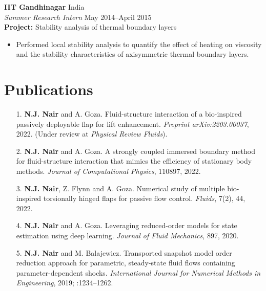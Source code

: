 \documentclass[margin]{res}
\begin{document}
\begin{resume}
{\bf IIT Gandhinagar} \hfill India\\
{\it Summer Research Intern} \hfill   May 2014--April 2015\\
\textbf{Project:} Stability analysis of thermal boundary layers
\begin{itemize}
	\item Performed local stability analysis to quantify the effect of heating on viscosity and the stability characteristics of axisymmetric thermal boundary layers.%
\end{itemize}


\section{\large Publications}
 \begin{itemize}
 
  	\item[1.] \textbf{N.J. Nair} and A. Goza. Fluid-structure interaction of a bio-inspired passively deployable flap for lift enhancement. \textit{Preprint arXiv:2203.00037}, 2022. (Under review at \textit{Physical Review Fluids}).

	\item[2.] \textbf{N.J. Nair} and A. Goza. A strongly coupled immersed boundary method for fluid-structure interaction that mimics the efficiency of stationary body methods. \textit{Journal of Computational Physics},  110897, 2022.
	
	\item[3.] \textbf{N.J. Nair}, Z. Flynn and A. Goza. Numerical study of multiple bio-inspired torsionally hinged flaps for passive flow control. \textit{Fluids}, 7(2), 44, 2022.
	
	\item[4.] \textbf{N.J. Nair} and A. Goza. Leveraging reduced-order models for state estimation using deep learning. \textit{Journal of Fluid Mechanics}, 897, 2020.
	
	\item[5.] \textbf{N.J. Nair} and M. Balajewicz. Transported snapshot model order reduction approach for parametric, steady-state fluid flows containing parameter-dependent shocks. \textit{International Journal for Numerical Methods in Engineering}, 2019; :1234–1262.
	
 \end{itemize}
 

\end{resume}
\end{document}
